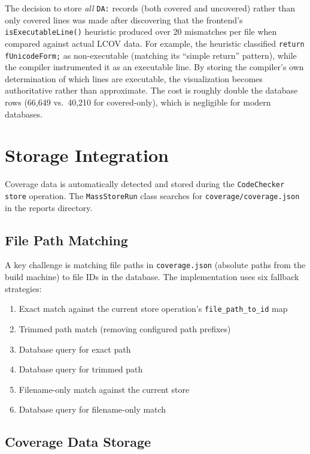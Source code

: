 The decision to store \emph{all} \texttt{DA:} records (both covered and uncovered) rather than only covered lines was made after discovering that the frontend's \texttt{isExecutableLine()} heuristic produced over 20 mismatches per file when compared against actual LCOV data. For example, the heuristic classified \texttt{return fUnicodeForm;} as non-executable (matching its ``simple return'' pattern), while the compiler instrumented it as an executable line. By storing the compiler's own determination of which lines are executable, the visualization becomes authoritative rather than approximate. The cost is roughly double the database rows (66,649 vs.\ 40,210 for covered-only), which is negligible for modern databases.

\section{Storage Integration}

Coverage data is automatically detected and stored during the \texttt{CodeChecker store} operation. The \texttt{MassStoreRun} class searches for \texttt{coverage/coverage.json} in the reports directory.

\subsection{File Path Matching}

A key challenge is matching file paths in \texttt{coverage.json} (absolute paths from the build machine) to file IDs in the database. The implementation uses six fallback strategies:

\begin{enumerate}
    \item Exact match against the current store operation's \texttt{file\_path\_to\_id} map
    \item Trimmed path match (removing configured path prefixes)
    \item Database query for exact path
    \item Database query for trimmed path
    \item Filename-only match against the current store
    \item Database query for filename-only match
\end{enumerate}

\subsection{Coverage Data Storage}

